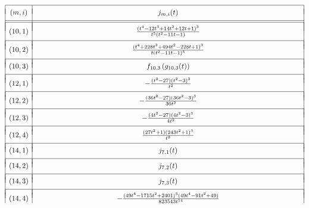 \begin{table}[!ht]
\[
\begin{array}{|c|c|} 
\hline
 &  \\ [-.75 em]
(m,i) & 
\hphantom{0000000000000000000000000000000000} j_{m,i}(t) \hphantom{0000000000000000000000000000000000}\\
 &  \\ [-.75 em]
\hline
\hline
& \\ [-.75em]
(10,1) & \frac{(t^4 - 12t^3 + 14t^2 + 12t + 1)^3}{t^5(t^2 - 11t - 1)} \\
& \\ [-.75em]
\hline
& \\ [-.75em]
(10,2) & \frac{(t^4 + 228t^3 + 494t^2 - 228t + 1)^3}{t(t^2 - 11t - 1)^5} \\
& \\ [-.75em]
\hline 
& \\ [-.75em]
(10,3) & f_{10,3}\left( g_{10,3}(t) \right)\\
& \\ [-.75em]
\hline 
& \\ [-.75em]
(12,1) & - \frac{(t^2 - 27)(t^2 - 3)^3}{t^2} \\
& \\ [-.75em]
\hline 
& \\ [-.75em]
(12,2) & - \frac{(36t^2 - 27)(36t^2 - 3)^3}{36t^2}\\
& \\ [-.75em]
\hline 
& \\ [-.75em]
(12,3) & - \frac{(4t^2 - 27)(4t^2 - 3)^3}{4t^2} \\
& \\ [-.75em]
\hline 
& \\ [-.75em]
(12,4) & \frac{(27t^2 + 1)(243t^2+1)^3}{t^2}\\
& \\ [-.75em]
\hline 
& \\ [-.75em]
 (14,1) & j_{7,1}(t) \\
& \\ [-.75em]
\hline 
& \\ [-.75em]
 (14,2) & j_{7,2}(t) \\
 & \\ [-.75em]
\hline 
& \\ [-.75em]
(14,3) & j_{7,3}(t) \\
& \\ [-.75em]
\hline 
& \\ [-.75em]
(14,4) &  - \frac{(49t^4 - 1715t^2 + 2401)^3(49t^4 - 91t^2 + 49)}{823543t^{14}} \\

\end{array}\]
\end{table}
